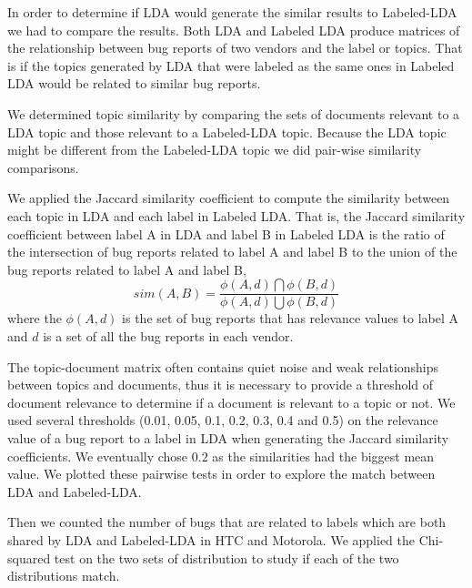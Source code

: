 \documentclass[10pt, conference, compsocconf]{IEEEtran}
\begin{document}
In order to determine if LDA would generate the similar results to
Labeled-LDA we had to compare the results.
Both LDA and Labeled LDA produce matrices of
 the relationship between bug reports of two vendors and the
label or topics. 
That is if the topics generated by LDA that were labeled as the same
ones in Labeled LDA would be related to similar bug reports.

We determined topic similarity by comparing the sets of documents
relevant to a LDA topic and those relevant to a Labeled-LDA
topic. Because the LDA topic might be different from the Labeled-LDA
topic we did pair-wise similarity comparisons.

We applied the Jaccard similarity coefficient to compute the
similarity between each topic in LDA and each label in Labeled LDA. 
That is, the Jaccard similarity coefficient between label A in LDA and
label B in Labeled LDA is the ratio of the intersection of bug reports
related to label A and label B to the union of the bug reports related
to label A and label B,
\begin{equation}
sim(A,B) = \frac{\phi(A,d)\bigcap\phi(B,d)}{\phi(A,d)\bigcup\phi(B,d)}
\end{equation}
where the $\phi(A,d)$ is the set of bug reports that has relevance
values to label A and $d$ is a set of all the bug reports in each
vendor.

The topic-document matrix often contains quiet noise and weak
relationships between topics and documents, thus it is necessary to
provide a threshold of document relevance to determine if a document
is relevant to a topic or not.
We used several thresholds (0.01, 0.05, 0.1, 0.2, 0.3, 0.4 and 0.5) on
the relevance value of a bug report to a label in LDA when generating
the Jaccard similarity coefficients. We eventually chose $0.2$ as the similarities had the biggest mean value.
We plotted these pairwise tests in order to explore the match between
LDA and Labeled-LDA.

Then we counted the number of bugs that are related to labels which are both shared by LDA and Labeled-LDA in HTC and Motorola. We applied the Chi-squared test on the two sets of distribution to study if each of the two distributions match.
\end{document}
